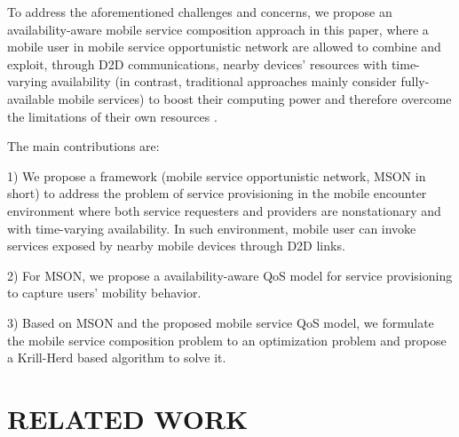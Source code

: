 \documentclass[10pt,journal,compsoc]{IEEEtran}
\begin{document}
To address the aforementioned challenges and concerns, we propose an availability-aware mobile service composition approach in this paper, where a mobile user in mobile service opportunistic network are allowed to combine and exploit, through D2D communications, nearby devices' resources with time-varying availability (in contrast, traditional approaches mainly consider fully-available mobile services) to boost their computing power and therefore overcome the limitations of their own resources \cite{giordano2011human}. 

The main contributions are:

1) We propose a framework (mobile service opportunistic network, MSON in short) to address the problem of service provisioning in the mobile encounter environment where both service requesters and providers are nonstationary and with time-varying availability. In such environment, mobile user can invoke services exposed by nearby mobile devices through D2D links.

2) For MSON, we propose a availability-aware QoS model for service provisioning to capture users' mobility behavior.

3) Based on MSON and the proposed mobile service QoS model, we formulate the mobile service composition problem to an optimization problem and propose a Krill-Herd based algorithm to solve it. 



\section{RELATED WORK}
\end{document}
